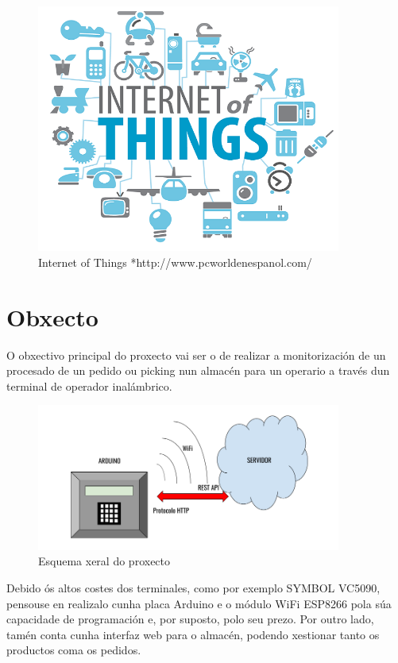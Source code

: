 \documentclass[11pt,twoside]{book}
\begin{document}
\begin{figure}[H]
	\begin{center}
		\includegraphics[width=10cm]{images/IoT.png}
	\end{center}
	\caption{Internet of Things *http://www.pcworldenespanol.com/}
	\label{fig:IoT}
\end{figure}

\section{Obxecto}

O obxectivo principal do proxecto vai ser o de realizar a monitorización de un procesado de un pedido ou picking nun almacén para un operario a través dun terminal de operador inalámbrico.

\begin{figure}[H]
	\begin{center}
		\includegraphics[width=10cm]{images/esquema_xeral.png}
	\end{center}
	\caption{Esquema xeral do proxecto}
	\label{fig:IoT}
\end{figure}

Debido ós altos costes dos terminales, como por exemplo SYMBOL VC5090, pensouse en realizalo cunha placa Arduino e o módulo WiFi ESP8266 pola súa capacidade de programación e, por suposto, polo seu prezo.
Por outro lado, tamén conta cunha interfaz web para o almacén, podendo xestionar tanto os productos coma os pedidos.
\end{document}
